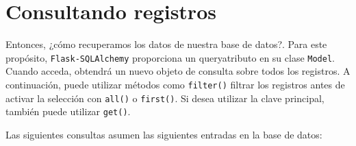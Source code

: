 \documentclass[11pt,letterpaper,notumble]{leaflet}
\begin{document}
		
		    
		\vspace*{-0.4cm}
		    
		\section{Consultando registros}
		    
		Entonces, ¿cómo recuperamos los datos de nuestra base de datos?. Para este propósito, \texttt{Flask-SQLAlchemy} proporciona un queryatributo en su clase \texttt{Model}. Cuando acceda, obtendrá un nuevo objeto de consulta sobre todos los registros. A continuación, puede utilizar métodos como \texttt{filter()} filtrar los registros antes de activar la selección con \texttt{all()} o \texttt{first()}. Si desea utilizar la clave principal, también puede utilizar \texttt{get()}.
		
		Las siguientes consultas asumen las siguientes entradas en la base de datos:
	
\end{document}

